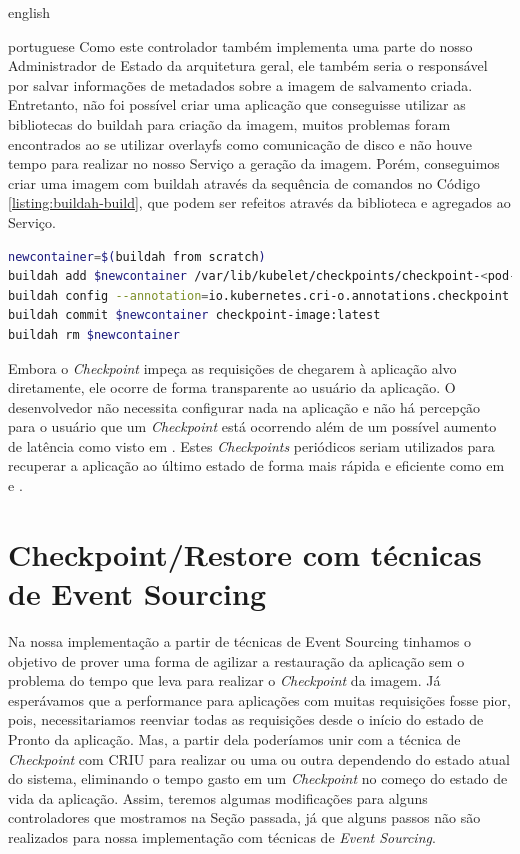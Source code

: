 \begin{otherlanguage*}{english}
\begin{otherlanguage*}{portuguese}
Como este controlador também implementa uma parte do nosso Administrador de Estado da 
arquitetura geral, ele também seria o responsável por salvar informações de metadados
sobre a imagem de salvamento criada. Entretanto, não foi possível criar uma aplicação
que conseguisse utilizar as bibliotecas do buildah para criação da imagem, muitos
problemas foram encontrados ao se utilizar overlayfs como comunicação de disco e não
houve tempo para realizar no nosso Serviço a geração da imagem. Porém, conseguimos criar
uma imagem com buildah através da sequência de comandos no Código
\ref{listing:buildah-build}, que podem ser refeitos através da biblioteca e agregados ao
Serviço.

\begin{lstlisting}[language=bash,caption={Comandos do buildah para construir a imagem de recuperação a partir de um Checkpoint feito pelo CRIU através do kubelet.},label={listing:buildah-build}]
newcontainer=$(buildah from scratch)
buildah add $newcontainer /var/lib/kubelet/checkpoints/checkpoint-<pod-name>_<namespace-name>-<container-name>-<timestamp>.tar /
buildah config --annotation=io.kubernetes.cri-o.annotations.checkpoint.name=<container-name> $newcontainer
buildah commit $newcontainer checkpoint-image:latest
buildah rm $newcontainer
\end{lstlisting}

Embora o \textit{Checkpoint} impeça as requisições de chegarem à aplicação alvo
diretamente, ele ocorre de forma transparente ao usuário da aplicação. O desenvolvedor
não necessita configurar nada na aplicação e não há percepção para o usuário que um
\textit{Checkpoint} está ocorrendo além de um possível aumento de latência como visto em
\cite{schmidttransparent}. Estes \textit{Checkpoints} periódicos seriam utilizados para
recuperar a aplicação ao último estado de forma mais rápida e eficiente como em
\cite{vayghan2021kubernetes} \cite{muller2022architecture} \cite{oh2018stateful} e
\cite{schmidttransparent}.

\section{Checkpoint/Restore com técnicas de Event Sourcing}

Na nossa implementação a partir de técnicas de Event Sourcing tinhamos o objetivo de
prover uma forma de agilizar a restauração da aplicação sem o problema do tempo que leva
para realizar o \textit{Checkpoint} da imagem. Já esperávamos que a performance para
aplicações com muitas requisições fosse pior, pois, necessitariamos reenviar todas as
requisições desde o início do estado de Pronto da aplicação. Mas, a partir dela
poderíamos unir com a técnica de \textit{Checkpoint} com CRIU para realizar ou uma ou
outra dependendo do estado atual do sistema, eliminando o tempo gasto em um
\textit{Checkpoint} no começo do estado de vida da aplicação. Assim, teremos algumas
modificações para alguns controladores que mostramos na Seção passada, já que alguns
passos não são realizados para nossa implementação com técnicas de \textit{Event Sourcing}.


\end{otherlanguage*}
\end{otherlanguage*}
